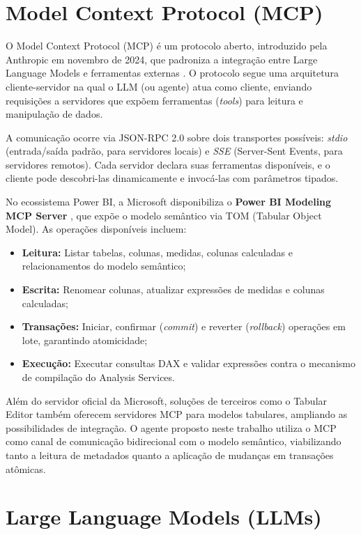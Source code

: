 \documentclass[
    12pt,               %
    openright,          %
    oneside,            %
    a4paper,            %
    chapter=TITLE,      %
    section=TITLE,      %
    brazil              %
]{abntex2}
\begin{document}
\section{Model Context Protocol (MCP)}

O Model Context Protocol (MCP) é um protocolo aberto, introduzido pela Anthropic em novembro de 2024, que padroniza a integração entre Large Language Models e ferramentas externas \cite{microsoft2025mcp}. O protocolo segue uma arquitetura cliente-servidor na qual o LLM (ou agente) atua como cliente, enviando requisições a servidores que expõem ferramentas (\textit{tools}) para leitura e manipulação de dados.

A comunicação ocorre via JSON-RPC 2.0 sobre dois transportes possíveis: \textit{stdio} (entrada/saída padrão, para servidores locais) e \textit{SSE} (Server-Sent Events, para servidores remotos). Cada servidor declara suas ferramentas disponíveis, e o cliente pode descobri-las dinamicamente e invocá-las com parâmetros tipados.

No ecossistema Power BI, a Microsoft disponibiliza o \textbf{Power BI Modeling MCP Server} \cite{microsoft2025mcp}, que expõe o modelo semântico via TOM (Tabular Object Model). As operações disponíveis incluem:

\begin{itemize}
    \item \textbf{Leitura:} Listar tabelas, colunas, medidas, colunas calculadas e relacionamentos do modelo semântico;
    \item \textbf{Escrita:} Renomear colunas, atualizar expressões de medidas e colunas calculadas;
    \item \textbf{Transações:} Iniciar, confirmar (\textit{commit}) e reverter (\textit{rollback}) operações em lote, garantindo atomicidade;
    \item \textbf{Execução:} Executar consultas DAX e validar expressões contra o mecanismo de compilação do Analysis Services.
\end{itemize}

Além do servidor oficial da Microsoft, soluções de terceiros como o Tabular Editor \cite{tabulareditor2025mcp} também oferecem servidores MCP para modelos tabulares, ampliando as possibilidades de integração. O agente proposto neste trabalho utiliza o MCP como canal de comunicação bidirecional com o modelo semântico, viabilizando tanto a leitura de metadados quanto a aplicação de mudanças em transações atômicas.

\section{Large Language Models (LLMs)}
\label{sec:llms}
\end{document}
